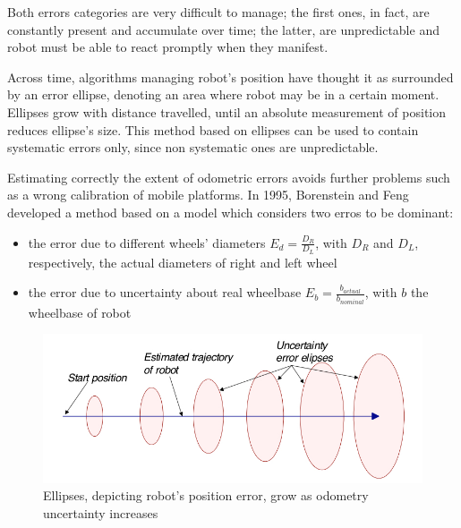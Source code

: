 \documentclass[a4paper, onecolumn]{report}
\begin{document}
Both errors categories are very difficult to manage; the first ones, in fact, are constantly present and accumulate over time; the latter, are unpredictable and robot must be able to react promptly when they manifest.

Across time, algorithms managing robot's position have thought it as surrounded by an error ellipse, denoting an area where robot may be in a certain moment. Ellipses grow with distance travelled, until an absolute measurement of position reduces ellipse's size. This method based on ellipses can be used to contain systematic errors only, since non systematic ones are unpredictable.

Estimating correctly the extent of odometric errors avoids further problems such as a wrong calibration of mobile platforms. In 1995, Borenstein and Feng developed a method based on a model which considers two erros to be dominant:
\begin{itemize}
	\item{the error due to different wheels' diameters $E_d = \frac{D_R}{D_L}$, with $D_R$ and $D_L$, respectively, the actual diameters of right and left wheel}
	\item{the error due to uncertainty about real wheelbase $E_b = \frac{b_{actual}}{b_{nominal}}$, with $b$ the wheelbase of robot}
\end{itemize}
\begin{figure}[htbp]
\centering
\centering\setlength{\captionmargin}{0pt}%
\includegraphics[width=.90\textwidth]{images/ellipses.jpeg}
\caption{Ellipses, depicting robot's position error, grow as odometry uncertainty increases}
\end{figure}
\end{document}
